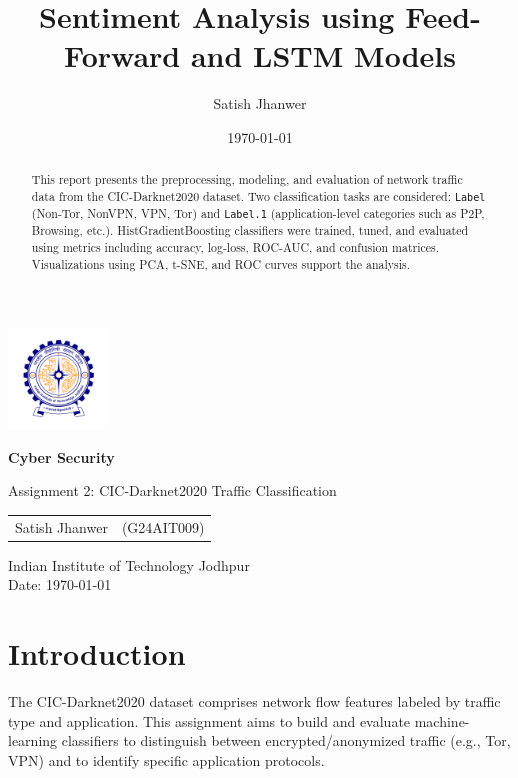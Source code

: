 \documentclass[12pt]{article}
\title{
  \Huge \textbf{Sentiment Analysis using Feed-Forward and LSTM Models}
}
\author[1]{Satish Jhanwer}
\affil[1]{Roll No: G24AIT009}
\date{\today}
\begin{document}
\justifying

\begin{titlepage}
  \centering
  \includegraphics[width=0.2\textwidth]{images/logo.png}\par\vspace{1cm}

  {\Huge \bfseries Cyber Security \par}
  \vspace{0.5cm}
  {\Large Assignment 2: CIC-Darknet2020 Traffic Classification \par}
  \vspace{1cm}

  \begin{tabular}{rl}
    Satish Jhanwer & (G24AIT009) \\
  \end{tabular}

  \vfill

  Indian Institute of Technology Jodhpur \\
  \vspace{0.5cm}
  Date: \today

\end{titlepage}

\newpage

\begin{abstract}
  This report presents the preprocessing, modeling, and evaluation of network traffic data from the CIC-Darknet2020 dataset. Two classification tasks are considered: \texttt{Label} (Non-Tor, NonVPN, VPN, Tor) and \texttt{Label.1} (application-level categories such as P2P, Browsing, etc.). HistGradientBoosting classifiers were trained, tuned, and evaluated using metrics including accuracy, log-loss, ROC-AUC, and confusion matrices. Visualizations using PCA, t-SNE, and ROC curves support the analysis.
\end{abstract}

\newpage

\tableofcontents
\newpage
\listoffigures
\newpage

\section{Introduction}
The CIC-Darknet2020 dataset comprises network flow features labeled by traffic type and application. This assignment aims to build and evaluate machine-learning classifiers to distinguish between encrypted/anonymized traffic (e.g., Tor, VPN) and to identify specific application protocols.
\end{document}
